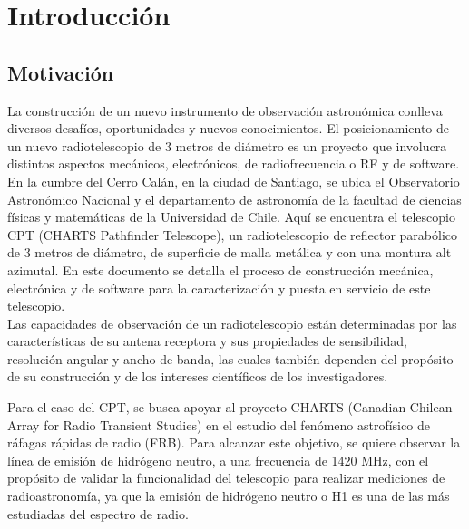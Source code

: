 \chapter{Introducción}
\section{Motivación}

La construcción de un nuevo instrumento de observación astronómica conlleva diversos desafíos, oportunidades y nuevos conocimientos. El posicionamiento de un nuevo radiotelescopio de 3 metros de diámetro es un proyecto que involucra distintos aspectos mecánicos, electrónicos, de radiofrecuencia o RF y de software.\\


En la cumbre del Cerro Calán, en la ciudad de Santiago, se ubica el Observatorio Astronómico Nacional y el departamento de astronomía de la facultad de ciencias físicas y matemáticas de la Universidad de Chile. Aquí se encuentra el telescopio CPT (CHARTS Pathfinder Telescope), un radiotelescopio de reflector parabólico de 3 metros de diámetro, de superficie de malla metálica y con una montura alt azimutal. En este documento se detalla el proceso de construcción mecánica, electrónica y de software para la caracterización y puesta en servicio de este telescopio.\\ 

Las capacidades de observación de un radiotelescopio están determinadas por las características de su antena receptora y sus propiedades de sensibilidad, resolución angular y ancho de banda, las cuales también dependen del propósito de su construcción y de los intereses científicos de los investigadores.

Para el caso del CPT, se busca apoyar al proyecto CHARTS (Canadian-Chilean Array for Radio Transient Studies) en el estudio del fenómeno astrofísico de ráfagas rápidas de radio (FRB). Para alcanzar este objetivo, se quiere observar la línea de emisión de hidrógeno neutro, a una frecuencia de 1420 MHz, con el propósito de validar la funcionalidad del telescopio para realizar mediciones de radioastronomía, ya que la emisión de hidrógeno neutro o H1 es una de las más estudiadas del espectro de radio.\\

